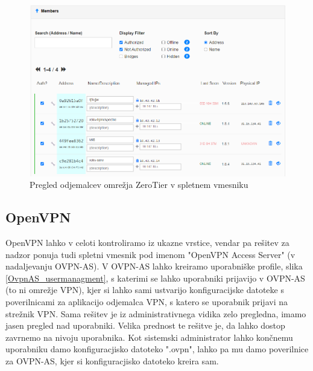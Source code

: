 \documentclass[a4paper, 12pt]{book}
\begin{document}
\begin{figure}[H]
\begin{center}
\includegraphics[width=1\textwidth]{fotografije/ZeroTier_administration.png}
\end{center}
\caption{Pregled odjemalcev omrežja ZeroTier v spletnem vmesniku \cite{rvidmar}}
\label{administracija_ZeroTier}
\end{figure}


\subsection{OpenVPN}
OpenVPN lahko v celoti kontroliramo iz ukazne vrstice, vendar pa rešitev za nadzor ponuja tudi spletni vmesnik pod imenom "OpenVPN Access Server" (v nadaljevanju OVPN-AS). V OVPN-AS lahko kreiramo uporabniške profile, slika \ref{OvpnAS_usermanagment}, s katerimi se lahko uporabniki prijavijo v OVPN-AS (to ni omrežje VPN), kjer si lahko sami ustvarijo konfiguracijske datoteke s poverilnicami za aplikacijo odjemalca VPN, s katero se uporabnik prijavi na strežnik VPN. Sama rešitev je iz administrativnega vidika zelo pregledna, imamo jasen pregled nad uporabniki. Velika prednost te rešitve je, da lahko dostop zavrnemo na nivoju uporabnika. Kot sistemski administrator lahko končnemu uporabniku damo konfiguracjisko datoteko ".ovpn", lahko pa mu damo poverilnice za OVPN-AS, kjer si konfiguracjisko datoteko kreira sam. 
\end{document}
